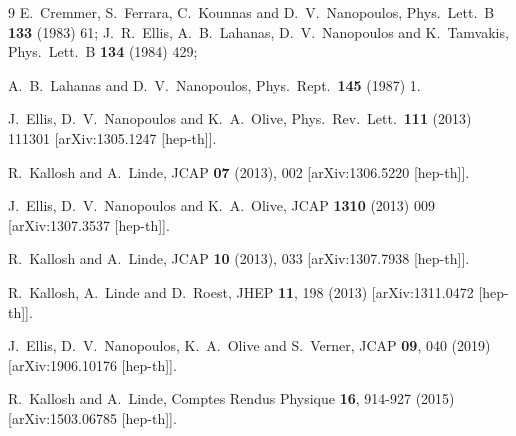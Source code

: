 \documentclass[aps,prev,twocolumn,preprintnumbers,floatfix,nofootinbib]{revtex4-1}
\begin{document}
\begin{thebibliography}{9}
E.~Cremmer, S.~Ferrara, C.~Kounnas and D.~V.~Nanopoulos,
  Phys.\ Lett.\ B {\bf 133} (1983) 61;
  J.~R.~Ellis, A.~B.~Lahanas, D.~V.~Nanopoulos and K.~Tamvakis,
  Phys.\ Lett.\ B {\bf 134} (1984) 429;

  A.~B.~Lahanas and D.~V.~Nanopoulos,
  Phys.\ Rept.\  {\bf 145} (1987) 1.

   J.~Ellis, D.~V.~Nanopoulos and K.~A.~Olive,
  Phys.\ Rev.\ Lett.\  {\bf 111} (2013) 111301 
  [arXiv:1305.1247 [hep-th]].

R.~Kallosh and A.~Linde,
JCAP \textbf{07} (2013), 002
[arXiv:1306.5220 [hep-th]].  

   J.~Ellis, D.~V.~Nanopoulos and K.~A.~Olive,
  JCAP {\bf 1310} (2013) 009
 [arXiv:1307.3537 [hep-th]].

R.~Kallosh and A.~Linde,
JCAP \textbf{10} (2013), 033
[arXiv:1307.7938 [hep-th]].

R.~Kallosh, A.~Linde and D.~Roest,
JHEP \textbf{11}, 198 (2013)
[arXiv:1311.0472 [hep-th]].

J.~Ellis, D.~V.~Nanopoulos, K.~A.~Olive and S.~Verner,
JCAP \textbf{09}, 040 (2019)
[arXiv:1906.10176 [hep-th]].

R.~Kallosh and A.~Linde,
Comptes Rendus Physique \textbf{16}, 914-927 (2015)
[arXiv:1503.06785 [hep-th]].


\end{thebibliography}
\end{document}
